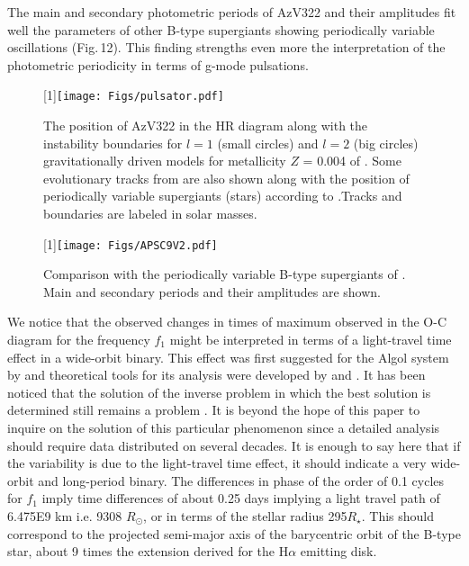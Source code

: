 \documentclass[useAMS,usenatbib]{mn2e}
\def\rsun{$R_{\odot}$}
\begin{document}
The main and secondary photometric periods of AzV322 and their amplitudes fit well the parameters of other B-type supergiants showing periodically variable oscillations 
(Fig.\,12).  This finding strengths even more the interpretation of the photometric periodicity in terms of g-mode pulsations. 

 \begin{figure}
\scalebox{1}[1]{\texttt{[image: Figs/pulsator.pdf]}}
\caption{The position of AzV322 in the HR diagram along with the instability boundaries for $l= 1$ (small circles) and $l= 2$ (big circles) gravitationally driven models for metallicity $Z$ = 0.004  of  \citet{2006ApJ...650.1111S}. Some evolutionary tracks from \citet{2001A&A...373..555M} are also shown along with 
the position of periodically variable supergiants (stars) according to  \citet[][]{2007A&A...463.1093L}.Tracks and boundaries are labeled in solar masses.}
  \label{x}
\end{figure}


\begin{figure}
\scalebox{1}[1]{\texttt{[image: Figs/APSC9V2.pdf]}}
\caption{Comparison with the periodically variable B-type supergiants of \citet{2007A&A...463.1093L}. Main and secondary periods and their amplitudes are shown.}
  \label{x}
\end{figure}

We notice that the observed changes in times of maximum observed in the O-C diagram for the frequency $f_1$ might be interpreted in terms of 
a light-travel time effect in a wide-orbit binary. This effect was first suggested for the Algol system by \citet{1888AJ......7..165C} and theoretical tools for its analysis were developed by \citet{1922BAN.....1...93W} and \citet{1952ApJ...116..211I}. It has been noticed that the solution of the inverse problem in which the best solution is determined still remains a problem \citep[][]{2016A&A...589A..94L}. It is beyond the hope of this paper to inquire on the solution 
of this particular phenomenon since a detailed analysis should require data distributed on several decades. It is enough to say here that
if the variability is due to the light-travel time effect, it should indicate a very wide-orbit and long-period binary. The differences in phase of the order of 0.1 cycles for $f_1$ imply time differences of about 0.25 days implying a light travel path of 6.475E9 km i.e.  9308 \rsun, or in terms of the stellar radius 295$R_{\star}$.
This should correspond to the projected semi-major axis of the barycentric orbit of the B-type star, about 9 times the extension derived for the H$\alpha$ emitting disk. 
\end{document}
